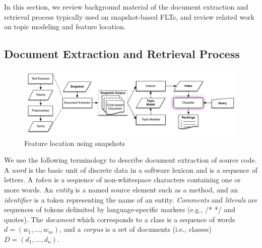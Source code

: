 

In this section, we review background material of the document extraction and retrieval process
typically used on snapshot-based FLTs,
and review related work on topic modeling and feature location.

\subsection{Document Extraction and Retrieval Process}

\begin{figure}
\centerline{\includegraphics[width=.9\textwidth]{figures/snapshot-flt}}
\caption{Feature location using snapshots}
\label{fig:snapshot}
\end{figure}

We use the following terminology to describe document extraction of source code.
A \textit{word} is the basic unit of discrete data in a software lexicon and is a sequence of letters.
A \textit{token} is a sequence of non-whitespace characters containing one or more words.
An \textit{entity} is a named source element such as a method,
and an \textit{identifier} is a token representing the name of an entity.
\textit{Comments} and \textit{literals} are sequences of tokens delimited by language-specific markers (e.g., /* */ and quotes).
The \textit{document} which corresponds to a class is a sequence of words $d = (w_1, \ldots, w_m)$,
and a \textit{corpus} is a set of documents (i.e., classes) $D = (d_1, \ldots, d_n)$.

